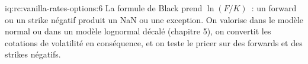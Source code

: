 \begin{solution}{iq:rc:vanilla-rates-options:6}
La formule de Black prend $\ln(F/K)$~: un forward ou un strike négatif produit un NaN ou
une exception. On valorise dans le modèle normal ou dans un modèle lognormal décalé (chapitre
5), on convertit les cotations de volatilité en conséquence, et on teste le pricer sur des
forwards et des strikes négatifs.
\end{solution}
